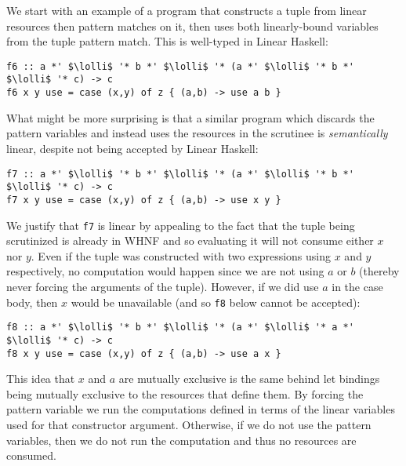 \documentclass[acmsmall,review,anonymous,screen]{acmart}
\newcommand{\incode}[1]{\lstinline{#1}}
\newcommand{\lolli}{\multimap}
\begin{document}
We start with an
example of a program that constructs a tuple from linear resources then pattern
matches on it, then uses both linearly-bound variables from the tuple pattern
match. This is well-typed in Linear Haskell:
\begin{working}
\begin{lstlisting}
f6 :: a *' $\lolli$ '* b *' $\lolli$ '* (a *' $\lolli$ '* b *' $\lolli$ '* c) -> c
f6 x y use = case (x,y) of z { (a,b) -> use a b }
\end{lstlisting}
\end{working}
What might be more surprising is that a similar program which discards the
pattern variables and instead uses the resources in the scrutinee is 
\emph{semantically} linear, despite not being accepted by Linear Haskell:
\begin{notyet}
\begin{lstlisting}
f7 :: a *' $\lolli$ '* b *' $\lolli$ '* (a *' $\lolli$ '* b *' $\lolli$ '* c) -> c
f7 x y use = case (x,y) of z { (a,b) -> use x y }
\end{lstlisting}
\end{notyet}
We justify that \incode{f7} is linear by appealing to the fact that 
the tuple being scrutinized is already in WHNF and so evaluating it will
not consume either $x$ nor $y$. Even if the tuple was constructed with
two expressions using $x$ and $y$ respectively, no computation would happen
since we are not using $a$ or $b$ (thereby never forcing the arguments
of the tuple). However, if we did use $a$ in the case body, then $x$
would be unavailable (and so \incode{f8} below cannot be accepted):
\begin{noway}
\begin{lstlisting}
f8 :: a *' $\lolli$ '* b *' $\lolli$ '* (a *' $\lolli$ '* a *' $\lolli$ '* c) -> c
f8 x y use = case (x,y) of z { (a,b) -> use a x }
\end{lstlisting}
\end{noway}
This idea that $x$ and $a$ are mutually exclusive is the same behind let
bindings being mutually exclusive to the resources that define them.
By forcing the pattern variable we run the computations
defined in terms of the linear variables used for that constructor
argument. Otherwise, if we do not use the pattern variables, then we
do not run the computation and thus no resources are consumed.
\end{document}
